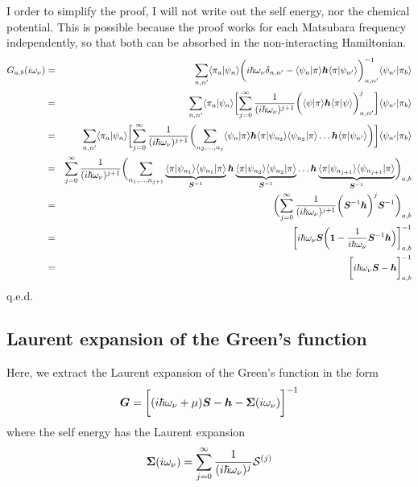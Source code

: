 \documentclass[11pt,a4paper]{report}
\begin{document}
I order to simplify the proof, I will not write out the self energy,
nor the chemical potential. This is possible because the proof works
for each Matsubara frequency independently, so that both can be
absorbed in the non-interacting Hamiltonian.
\begin{eqnarray}
G_{a,b}(i\omega_\nu)
&=&
\sum_{n,n'}\langle\pi_a|\psi_{n}\rangle
\biggl(i\hbar\omega_\nu\delta_{n,n'}
-
\langle\psi_n|\pi\rangle
\bm{h}
\langle\pi|\psi_{n'}\rangle\biggr)^{-1}_{n,n'}
\langle\psi_{n'}|\pi_b\rangle
\nonumber\\
&=&
\sum_{n,n'}\langle\pi_a|\psi_{n}\rangle
\biggl[
\sum_{j=0}^\infty
\frac{1}{(i\hbar\omega_\nu)^{j+1}}
\biggl(
\langle\psi|\pi\rangle
\bm{h}
\langle\pi|\psi\rangle\biggr)^j_{n,n'}
\biggr]\langle\psi_{n'}|\pi_b\rangle
\nonumber\\
&=&
\sum_{n,n'}\langle\pi_a|\psi_{n}\rangle
\biggl[
\sum_{j=0}^\infty
\frac{1}{(i\hbar\omega_\nu)^{j+1}}
\biggl(\sum_{n_2,\ldots,n_{j}} 
\langle\psi_{n}|\pi\rangle
\bm{h}
\langle\pi|\psi_{n_2}\rangle\langle\psi_{n_2}|\pi\rangle
\ldots
\bm{h}
\langle\pi|\psi_{n'}\rangle\biggr)\biggr]
\langle\psi_{n'}|\pi_b\rangle
\nonumber\\
&=&
\sum_{j=0}^\infty\frac{1}{(i\hbar\omega_\nu)^{j+1}}
\biggl(\sum_{n_1,\ldots,n_{j+1}} 
\underbrace{\langle\pi|\psi_{n_1}\rangle
\langle\psi_{n_1}|\pi\rangle}_{\bm{S}^{-1}}
\bm{h}
\underbrace{\langle\pi|\psi_{n_2}\rangle\langle\psi_{n_2}|\pi\rangle}_{\bm{S}^{-1}}
\ldots
\bm{h}
\underbrace{\langle\pi|\psi_{n_{j+1}}\rangle
\langle\psi_{n_{j+1}}|\pi\rangle}_{\bm{S}^{-1}}
\biggr)_{a,b}
\nonumber\\
&=&
\biggl(\sum_{j=0}^\infty\frac{1}{(i\hbar\omega_\nu)^{j+1}}
\biggl(\bm{S}^{-1}\bm{h}\biggr)^{j}\bm{S}^{-1}\biggr)_{a,b}
\nonumber\\
&=&\biggl[i\hbar\omega_\nu\bm{S}\biggl
(\bm{1}-\frac{1}{i\hbar\omega_\nu}\bm{S}^{-1}\bm{h}\Bigr)\biggr]^{-1}_{a,b}
\nonumber\\
&=&\biggl[i\hbar\omega_\nu\bm{S}-\bm{h}\biggr]^{-1}_{a,b}
\end{eqnarray}
q.e.d.

\subsection{Laurent expansion of the Green's function}
\label{sec:laurentgreen}
Here, we extract the Laurent expansion of the Green's function in the form
\begin{eqnarray}
\bm{G}=\biggl[(i\hbar\omega_\nu+\mu)\bm{S}
-\bm{h}-\bm{\Sigma}(i\omega_\nu)\biggr]^{-1}
\end{eqnarray}
where the self energy has the Laurent expansion
\begin{eqnarray}
\bm{\Sigma}(i\omega_\nu)
=\sum_{j=0}^\infty\frac{1}{(i\hbar\omega_\nu)^j}\mathcal{S}^{(j)}
\end{eqnarray}
\end{document}
